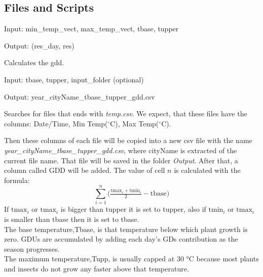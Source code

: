 \documentclass[12pt]{article}
\begin{document}
\subsection{Files and Scripts}
\begin{description}
\item[calc\_gdd.py]
\item Input: min\_temp\_vect, max\_temp\_vect, tbase, tupper
\item Output: (res\_day, res)
\item Calculates the gdd. %


\item[gdd.py]
\item Input: tbase, tupper, input\_folder (optional)
\item Output: year\_cityName\_tbase\_tupper\_gdd.csv
\item Searches for files that ends with \emph{temp.csv}. We expect, that these
files have the columns: Date/Time, Min Temp(${}^\circ$C), Max Temp(${}^\circ$C).

Then these columns of each file will be copied into a new csv file with the name
\emph{year\_cityName\_tbase\_tupper\_gdd.csv}, where cityName is extracted of the
current file name. That file will be saved in the folder \emph{Output}.
After that, a column called GDD will be added. 
The value of
cell $n$ is calculated with the formula:
$$
\sum_{i=1}^n \big( \tfrac{\text{tmax}_i+\text{tmin}_i}{2}-\text{tbase}\big)
$$
If $\text{tmax}_i$ or $\text{tmax}_i$ is bigger than tupper it is set to tupper,
 also if $\text{tmin}_i$ or $\text{tmax}_i$ 
is  smaller than tbase then it is set to tbase.
\\The base temperature,Tbase, is that temperature below which plant growth is zero.
 GDUs are accumulated by adding each day’s GDs contribution as the season progresses.
\\ The maximum temperature,Tupp, is usually capped at 30 °C because most plants and 
insects do not grow any faster above that temperature.


\end{description}
\end{document}
